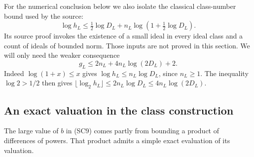 For the numerical conclusion below we also isolate the
classical class-number bound used by the source:
\[
 \log h_L\le\tfrac12\log D_L+
             n_L\log(1+\tfrac12\log D_L).
 \tag{SC14}
\]
Its source proof invokes the existence of a small ideal
in every ideal class and a count of ideals of bounded norm.
Those inputs are not proved in this section.
We will only need the weaker consequence
\[
                        g_L\le2n_L+4n_L\log(2D_L)+2.
                        \tag{SC15}
\]
Indeed $\log(1+x)\le x$ gives
$\log h_L\le n_L\log D_L$, since $n_L\ge1$.
The inequality $\log2>1/2$ then gives
$\lfloor\log_2h_L\rfloor\le2n_L\log D_L
\le4n_L\log(2D_L)$.

\subsection{An exact valuation in the class construction}

The large value of $b$ in (SC9) comes partly from bounding
a product of differences of powers.  That product admits
a simple exact evaluation of its valuation.

